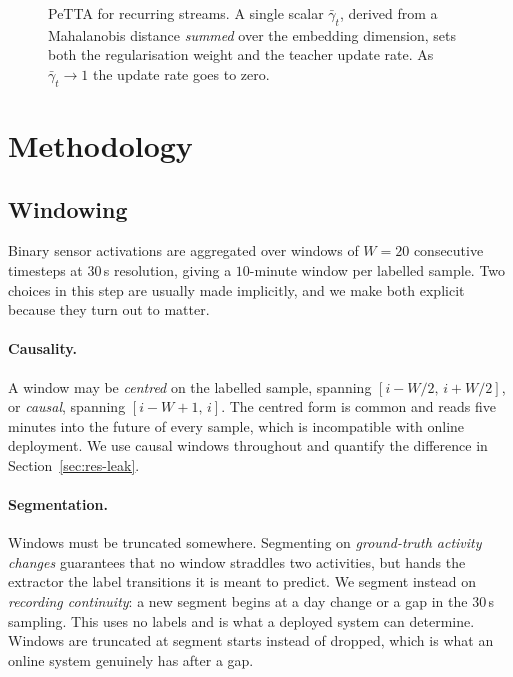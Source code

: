 \documentclass[a4paper,fleqn]{cas-dc}
\begin{document}
\begin{figure}[t]
\centering
\resizebox{0.86\textwidth}{!}{\figPeTTA}
\caption{PeTTA for recurring streams. A single scalar $\bar\gamma_t$, derived from a
Mahalanobis distance \emph{summed} over the embedding dimension, sets both the
regularisation weight and the teacher update rate. As $\bar\gamma_t\to1$ the update rate
goes to zero.}
\label{fig:petta}
\end{figure}

\section{Methodology}
\label{sec:method}

\subsection{Windowing}
\label{sec:method-window}

Binary sensor activations are aggregated over windows of $W=20$ consecutive timesteps at
$30$\,s resolution, giving a $10$-minute window per labelled sample. Two choices in this
step are usually made implicitly, and we make both explicit because they turn out to
matter.

\paragraph{Causality.} A window may be \emph{centred} on the labelled sample, spanning
$[i-W/2,\,i+W/2]$, or \emph{causal}, spanning $[i-W+1,\,i]$. The centred form is common
and reads five minutes into the future of every sample, which is incompatible with online
deployment. We use causal windows throughout and quantify the difference in
Section~\ref{sec:res-leak}.

\paragraph{Segmentation.} Windows must be truncated somewhere. Segmenting on
\emph{ground-truth activity changes} guarantees that no window straddles two activities,
but hands the extractor the label transitions it is meant to predict. We segment instead
on \emph{recording continuity}: a new segment begins at a day change or a gap in the
$30$\,s sampling. This uses no labels and is what a deployed system can determine. Windows
are truncated at segment starts instead of dropped, which is what an online system
genuinely has after a gap.
\end{document}
